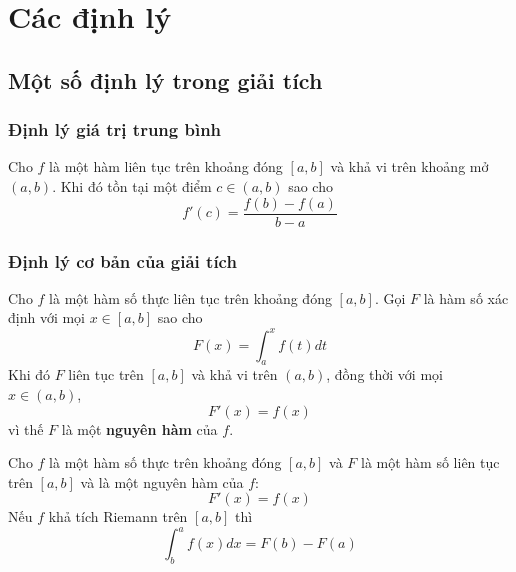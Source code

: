 \chapter{Các định lý}

\section{Một số định lý trong giải tích}

\subsection{Định lý giá trị trung bình}

\begin{theorem}
Cho $f$ là một hàm liên tục trên khoảng đóng $[a, b]$ và khả vi trên khoảng mở $(a, b)$. Khi đó tồn tại một điểm $c \in (a, b)$ sao cho
$$
f'(c) = \frac{f(b) - f(a)}{b - a}
$$
\end{theorem}

\subsection{Định lý cơ bản của giải tích}

\begin{theorem}
Cho $f$ là một hàm số thực liên tục trên khoảng đóng $[a, b]$. Gọi $F$ là hàm số xác định với mọi $x \in [a, b]$ sao cho
$$
F(x) = \int_a^x f(t)dt
$$
Khi đó $F$ liên tục trên $[a, b]$ và khả vi trên $(a, b)$, đồng thời với mọi $x \in (a, b)$, 
$$
F'(x) = f(x)
$$
vì thế $F$ là một \textbf{nguyên hàm} của $f$.
\end{theorem}

\begin{theorem}
Cho $f$ là một hàm số thực trên khoảng đóng $[a, b]$ và $F$ là một hàm số liên tục trên $[a, b]$ và là một nguyên hàm của $f$:
$$
F'(x) = f(x)
$$
Nếu $f$ khả tích Riemann trên $[a, b]$ thì
$$
\int_b^a f(x)dx = F(b) - F(a)
$$
\end{theorem}